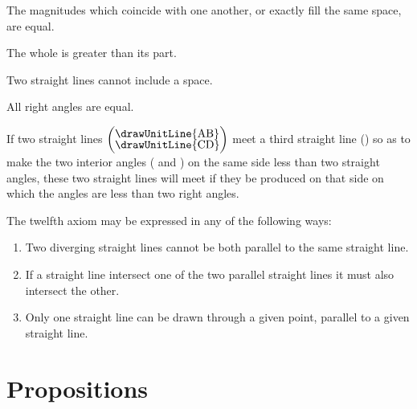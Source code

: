\documentclass{byrne-book}
\begin{document}
\startaxiom{}\label{ax:I.VIII}
The magnitudes which coincide with one another, or exactly fill the same space, are equal.


\startaxiom{}\label{ax:I.IX}
The whole is greater than its part.


\startaxiom{}\label{ax:I.X}
Two straight lines cannot include a space.


\startaxiom{}\label{ax:I.XI}
All right angles are equal.


\startaxiom{}\label{ax:I.XII}
\drawCurrentPictureInMargin[inside]
If two straight lines $\left(\vcenter{\nointerlineskip\hbox{\drawUnitLine{AB}}\nointerlineskip\hbox{\drawUnitLine{CD}}}\right)$ meet a third straight line () so as to make the two interior angles ( and ) on the same side less than two straight angles, these two straight lines will meet if they be produced on that side on which the angles are less than two right angles.


The twelfth axiom may be expressed in any of the following ways:
\begin{enumerate}
\item Two diverging straight lines cannot be both parallel to the same straight line.
\item If a straight line intersect one of the two parallel straight lines it must also intersect the other.
\item Only one straight line can be drawn through a given point, parallel to a given straight line.
\end{enumerate}

\chapter*{Propositions}

\label{prop:I.I}
\end{document}
